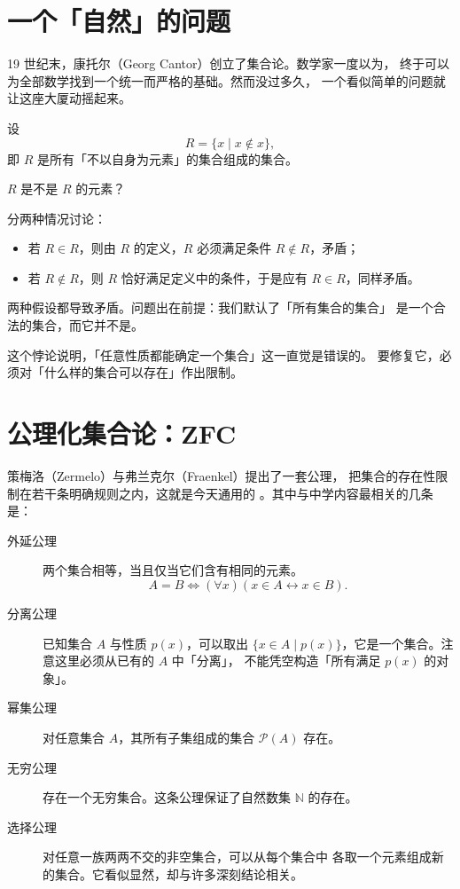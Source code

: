 
\section{一个「自然」的问题}

19 世纪末，康托尔（Georg Cantor）创立了集合论。数学家一度以为，
终于可以为全部数学找到一个统一而严格的基础。然而没过多久，
一个看似简单的问题就让这座大厦动摇起来。

\begin{definition}[罗素悖论]
设
\[
  R=\{x\mid x\notin x\},
\]
即 $R$ 是所有「不以自身为元素」的集合组成的集合。
\end{definition}

\begin{problem}
$R$ 是不是 $R$ 的元素？
\end{problem}

\begin{solution}
分两种情况讨论：
\begin{itemize}
  \item 若 $R\in R$，则由 $R$ 的定义，$R$ 必须满足条件 $R\notin R$，矛盾；
  \item 若 $R\notin R$，则 $R$ 恰好满足定义中的条件，于是应有 $R\in R$，同样矛盾。
\end{itemize}
两种假设都导致矛盾。问题出在前提：我们默认了「所有集合的集合」
是一个合法的集合，而它并不是。
\end{solution}

这个悖论说明，「任意性质都能确定一个集合」这一直觉是错误的。
要修复它，必须对「什么样的集合可以存在」作出限制。

\section{公理化集合论：ZFC}

策梅洛（Zermelo）与弗兰克尔（Fraenkel）提出了一套公理，
把集合的存在性限制在若干条明确规则之内，这就是今天通用的
。其中与中学内容最相关的几条是：

\begin{description}
  \item[外延公理] 两个集合相等，当且仅当它们含有相同的元素。
  \[
    A=B\iff(\forall x)(x\in A\leftrightarrow x\in B).
  \]
  \item[分离公理] 已知集合 $A$ 与性质 $p(x)$，可以取出
  $\{x\in A\mid p(x)\}$，它是一个集合。注意这里必须从已有的 $A$ 中「分离」，
  不能凭空构造「所有满足 $p(x)$ 的对象」。
  \item[幂集公理] 对任意集合 $A$，其所有子集组成的集合 $\mathcal{P}(A)$ 存在。
  \item[无穷公理] 存在一个无穷集合。这条公理保证了自然数集 $\mathbb{N}$ 的存在。
  \item[选择公理] 对任意一族两两不交的非空集合，可以从每个集合中
  各取一个元素组成新的集合。它看似显然，却与许多深刻结论相关。
\end{description}

